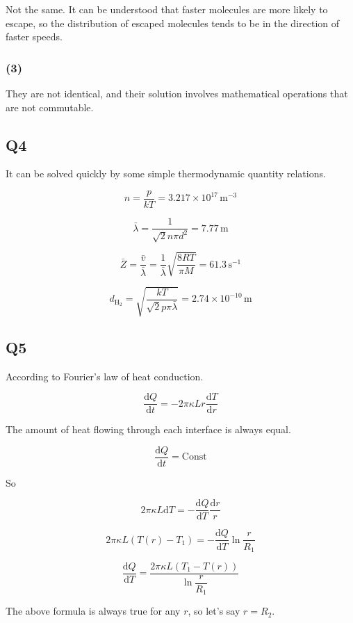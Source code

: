 \documentclass[a4paper,11pt]{amsart}
\theoremstyle{definition}
\begin{document}
	Not the same. It can be understood that faster molecules are more likely to escape, so the distribution of escaped molecules tends to be in the direction of faster speeds.
	
	\subsubsection*{(3)}
	
	They are not identical, and their solution involves mathematical operations that are not commutable.
	
	\subsection*{Q4}
	
	It can be solved quickly by some simple thermodynamic quantity relations.
	
	$$
	n=\frac{p}{kT}=3.217\times 10^{17}\,\mathrm{m}^{-3}
	$$
	
	$$
	\bar{\lambda}=\frac{1}{\sqrt{2}n\pi d^2}=7.77\,\mathrm{m}
	$$
	
	$$
	\bar{Z}=\frac{\bar{v}}{\bar{\lambda}}=\frac{1}{\bar{\lambda}}\sqrt{\frac{8RT}{\pi M}}=61.3\,\mathrm{s}^{-1}
	$$
	
	$$
	d_{\mathrm{H}_2}=\sqrt{\frac{kT}{\sqrt{2}p\pi \bar{\lambda}}}=2.74\times 10^{-10}\,\mathrm{m}
	$$
	
	\subsection*{Q5}
	
	According to Fourier's law of heat conduction.
	
	$$
	\frac{\mathrm{d}Q}{\mathrm{d}t}=-2\pi \kappa Lr\frac{\mathrm{d}T}{\mathrm{d}r}
	$$
	
	The amount of heat flowing through each interface is always equal.
	
	$$
	\dfrac{\mathrm{d}Q}{\mathrm{d}t}=\text{Const}
	$$
	
	So
	
	$$
	2\pi \kappa L\mathrm{d}T=-\frac{\mathrm{d}Q}{\mathrm{d}T}\frac{\mathrm{d}r}{r}
	$$
	
	$$
	2\pi \kappa L\left( T\left( r \right) -T_1 \right) =-\frac{\mathrm{d}Q}{\mathrm{d}T}\ln \frac{r}{R_1}
	$$
	
	$$
	\frac{\mathrm{d}Q}{\mathrm{d}T}=\frac{2\pi \kappa L\left( T_1-T\left( r \right) \right)}{\ln \dfrac{r}{R_1}}
	$$
	
	The above formula is always true for any $r$, so let's say $r=R_2$.
	
\end{document}
